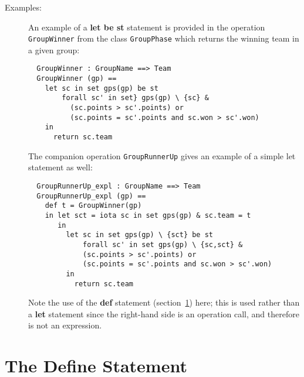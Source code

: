 \documentclass{overturerepchap}
\newcommand{\keyw}[1]{{\bf\ttfamily #1}}
\begin{document}
\begin{description}
\item[Examples:] An example of a \keyw{let be st} statement is provided in the
  operation \texttt{GroupWinner} 
from the class \texttt{GroupPhase}
  which returns the winning team in a given group: 
  \begin{lstlisting}
  GroupWinner : GroupName ==> Team
  GroupWinner (gp) ==
    let sc in set gps(gp) be st
        forall sc' in set} gps(gp) \ {sc} & 
          (sc.points > sc'.points) or
          (sc.points = sc'.points and sc.won > sc'.won)
    in 
      return sc.team
  \end{lstlisting}
  The companion operation \texttt{GroupRunnerUp} gives an example of a simple 
  let statement as well:
  \begin{lstlisting}
  GroupRunnerUp_expl : GroupName ==> Team
  GroupRunnerUp_expl (gp) ==
    def t = GroupWinner(gp)
    in let sct = iota sc in set gps(gp) & sc.team = t
       in
         let sc in set gps(gp) \ {sct} be st
             forall sc' in set gps(gp) \ {sc,sct} & 
             (sc.points > sc'.points) or
             (sc.points = sc'.points and sc.won > sc'.won)
         in 
           return sc.team
  \end{lstlisting}
  Note the use of the {\bf\ttfamily def} statement (section~\ref{defstmt})
  here; this is used rather than a {\bf\ttfamily let} statement since the
  right-hand side is an operation call, and therefore is not an
  expression. 

\end{description}

\section{The Define Statement}\label{defstmt}
\end{document}
